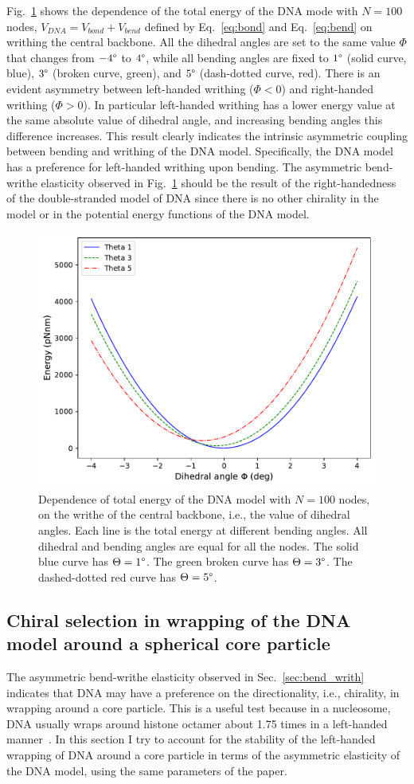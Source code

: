 \documentclass[a4paper,10pt]{article}
\begin{document}
Fig.~\ref{fig:bend_energy} shows the dependence of the total energy of the DNA mode with $N=100$ nodes, $V_{DNA}=V_{bond}+V_{bend}$ defined by Eq.~\ref{eq:bond} and Eq.~\ref{eq:bend} on writhing the central backbone.
All the dihedral angles are set to the same value $\Phi$ that changes from $-4\degree$ to $4\degree$, while all bending angles are fixed to $1\degree$ (solid curve, blue), $3\degree$ (broken curve, green), and $5\degree$ (dash-dotted curve, red).
There is an evident asymmetry between left-handed writhing ($\Phi<0$) and right-handed writhing ($\Phi>0$).
In particular left-handed writhing has a lower energy value at the same absolute value of dihedral angle, and increasing bending angles this difference increases.
This result clearly indicates the intrinsic asymmetric coupling between bending and writhing of the DNA model.
Specifically, the DNA model has a preference for left-handed writhing upon bending.
The asymmetric bend-writhe elasticity observed in Fig.~\ref{fig:bend_energy} should be the result of the right-handedness of the double-stranded model of DNA since there is no other chirality in the model or in the potential energy functions of the DNA model.

\begin{figure}[tb]
\centering
\includegraphics[width=.5\textwidth]{bw_energy.pdf}
\caption{Dependence of total energy of the DNA model with $N=100$ nodes, on the writhe of the central backbone, i.e., the value of dihedral angles.
Each line is the total energy at different bending angles.
All dihedral and bending angles are equal for all the nodes.
The solid blue curve has $\Theta=1\degree$.
The green broken curve has $\Theta=3\degree$.
The dashed-dotted red curve has $\Theta=5\degree$.}
\label{fig:bend_energy}
\end{figure}

\subsection{Chiral selection in wrapping of the DNA model around a spherical core particle}\label{sec:core}
The asymmetric bend-writhe elasticity observed in Sec.~\ref{sec:bend_writh} indicates that DNA may have a preference on the directionality, i.e., chirality, in wrapping around a core particle.
This is a useful test because in a nucleosome, DNA usually wraps around histone octamer about 1.75 times in a left-handed manner~\cite{1, 2}.
In this section I try to account for the stability of the left-handed wrapping of DNA around a core particle in terms of the asymmetric elasticity of the DNA model, using the same parameters of the paper.
\end{document}
